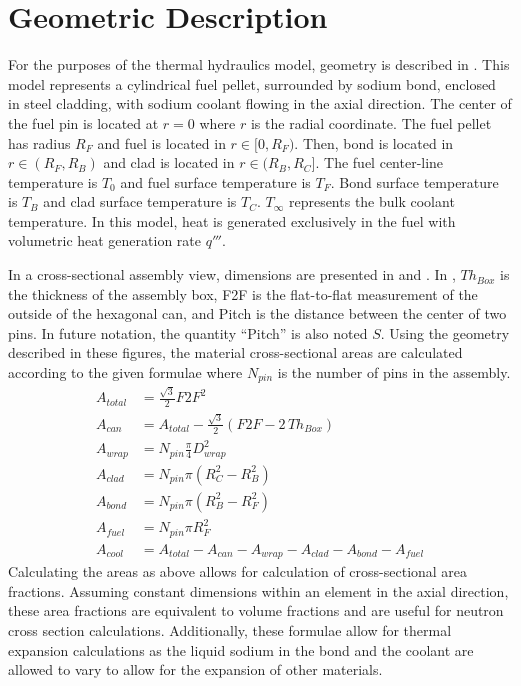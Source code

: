 \section{Geometric Description}
  For the purposes of the thermal hydraulics model, geometry is described in
  . This model represents a cylindrical fuel pellet,
  surrounded by sodium bond, enclosed in steel cladding, with sodium coolant
  flowing in the axial direction. The center of the fuel pin is located at
  $r=0$ where $r$ is the radial coordinate. The fuel pellet has radius $R_F$ and
  fuel is located in $r \in [0,R_F)$. Then, bond is located in $r \in (R_F,R_B)$
  and clad is located in $r \in (R_B,R_C]$. The fuel center-line temperature is
  $T_0$ and fuel surface temperature is $T_F$. Bond surface temperature is
  $T_B$ and clad surface temperature is $T_C$. $T_{\infty}$ represents the bulk
  coolant temperature. In this model, heat is generated exclusively in the fuel
  with volumetric heat generation rate $q'''$. 

  In a cross-sectional assembly view, dimensions are presented in
   and . In , $Th_{Box}$
  is the thickness of the assembly box, F2F is the flat-to-flat measurement of
  the outside of the hexagonal can, and Pitch is the distance between the
  center of two pins. In future notation, the quantity ``Pitch'' is also noted
  $S$. Using the geometry described in these figures, the material
  cross-sectional areas are calculated according to the given formulae where
  $N_{pin}$ is the number of pins in the assembly.
  \begin{align}
    A_{total} &= \frac{\sqrt{3}}{2} F2F^2 \\
    A_{can} &= A_{total} - 
      \frac{\sqrt{3}}{2} \left(  F2F - 2 \, Th_{Box} \right) \\
    A_{wrap} &= N_{pin} \frac{\pi}{4} D_{wrap}^2 \\
    A_{clad} &= N_{pin} \pi (R_C^2 - R_B^2) \\
    A_{bond} &= N_{pin} \pi (R_B^2 - R_F^2) \\
    A_{fuel} &= N_{pin} \pi R_F^2 \\
    A_{cool} &= A_{total} - A_{can} - A_{wrap} - A_{clad} - A_{bond} - A_{fuel}
  \end{align}
  Calculating the areas as above allows for calculation of cross-sectional area
  fractions. Assuming constant dimensions within an element in the axial
  direction, these area fractions are equivalent to volume fractions and are
  useful for neutron cross section calculations. Additionally, these formulae
  allow for thermal expansion calculations as the liquid sodium in the bond and
  the coolant are allowed to vary to allow for the expansion of other materials.

